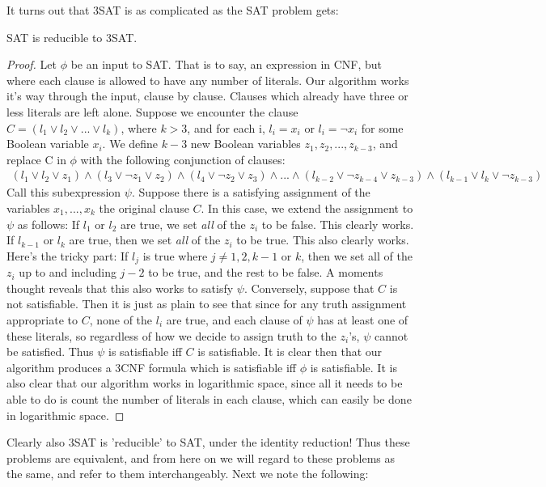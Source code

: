 It turns out that 3SAT is as complicated as the SAT problem gets:
\begin{fact}
    SAT is reducible to 3SAT. 
\end{fact}
\begin{proof}
    Let $\phi$ be an input to SAT. That is to say, an expression in CNF, but where each clause is allowed to have any number of literals. Our algorithm works it's way through the input, clause by clause. Clauses which already have three or less literals are left alone. Suppose we encounter the clause $C=(l_1 \vee l_2 \vee ... \vee l_k)$, where $k>3$, and for each i, $l_i = x_i$ or $l_i = \neg x_i$ for some Boolean variable $x_i$. We define $k-3$ new Boolean variables $z_1, z_2,...,z_{k-3}$, and replace C in $\phi$ with the following conjunction of clauses:
    \begin{align}
        (l_1 \vee l_2 \vee z_1) \wedge (l_3 \vee \neg z_1 \vee z_2) \wedge (l_4 \vee \neg z_2 \vee z_3) \wedge ... \wedge (l_{k-2} \vee \neg z_{k-4} \vee z_{k-3}) \wedge (l_{k-1} \vee l_k \vee \neg z_{k-3})
    \end{align}
    Call this subexpression $\psi$. Suppose there is a satisfying assignment of the variables $x_1,...,x_k$ the original clause $C$. In this case, we extend the assignment to $\psi$ as follows: If $l_1$ or $l_2$ are true, we set \textit{all} of the $z_i$ to be false. This clearly works. If $l_{k-1}$ or $l_k$ are true, then we set \textit{all} of the $z_i$ to be true. This also clearly works. Here's the tricky part: If $l_j$ is true where $j \neq 1,2,k-1$ or $k$, then we set all of the $z_i$ up to and including $j-2$ to be true, and the rest to be false. A moments thought reveals that this also works to satisfy $\psi$. Conversely, suppose that $C$ is not satisfiable. Then it is just as plain to see that since for any truth assignment appropriate to $C$, none of the $l_i$ are true, and each clause of $\psi$ has at least one of these literals, so regardless of how we decide to assign truth to the $z_i$'s, $\psi$ cannot be satisfied. Thus $\psi$ is satisfiable iff $C$ is satisfiable. It is clear then that our algorithm produces a 3CNF formula which is satisfiable iff $\phi$ is satisfiable. It is also clear that our algorithm works in logarithmic space, since all it needs to be able to do is count the number of literals in each clause, which can easily be done in logarithmic space. 
\end{proof}
Clearly also 3SAT is 'reducible' to SAT, under the identity reduction! Thus these problems are equivalent, and from here on we will regard to these problems as the same, and refer to them interchangeably. Next we note the following:
